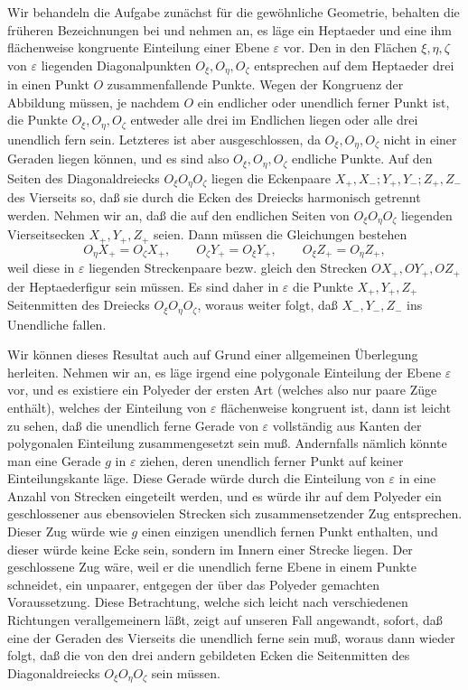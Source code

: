 \documentclass[11pt,a4paper]{article}
\begin{document}
Wir behandeln die Aufgabe zun\"achst f\"ur die gew\"ohnliche Geometrie, behalten die fr\"uheren Bezeichnungen bei und nehmen an, es l\"age ein Heptaeder und eine ihm fl\"achenweise kongruente Einteilung einer Ebene $\varepsilon$ vor. Den in den Fl\"achen $\xi,\eta,\zeta$ von $\varepsilon$ liegenden Diagonalpunkten $O_\xi,O_\eta,O_\zeta$ entsprechen auf dem Heptaeder drei in einen Punkt $O$ zusammenfallende Punkte. Wegen der Kongruenz der Abbildung m\"ussen, je nachdem $O$ ein endlicher oder unendlich ferner Punkt ist, die Punkte $O_\xi,O_\eta,O_\zeta$ entweder alle drei im Endlichen liegen oder alle drei unendlich fern sein. Letzteres ist aber ausgeschlossen, da $O_\xi,O_\eta,O_\zeta$ nicht in einer Geraden liegen k\"onnen, und es sind also $O_\xi,O_\eta,O_\zeta$ endliche Punkte. Auf den Seiten des Diagonaldreiecks $O_\xi O_\eta O_\zeta$ liegen die Eckenpaare $X_+,X_-;Y_+,Y_-;Z_+,Z_-$ des Vierseits so, da\ss{} sie durch die Ecken des Dreiecks harmonisch getrennt werden. Nehmen wir an, da\ss{} die auf den endlichen Seiten von $O_\xi O_\eta O_\zeta$ liegenden Vierseitsecken $X_+,Y_+,Z_+$ seien. Dann m\"ussen die Gleichungen bestehen
\[
 O_\eta X_+=O_\zeta X_+,
 \qquad O_\zeta Y_+=O_\xi Y_+,
 \qquad O_\xi Z_+=O_\eta Z_+,
\]
weil diese in $\varepsilon$ liegenden Streckenpaare bezw. gleich den Strecken $OX_+,OY_+,OZ_+$ der Heptaederfigur sein m\"ussen. Es sind daher in $\varepsilon$ die Punkte $X_+,Y_+,Z_+$ Seitenmitten des Dreiecks $O_\xi O_\eta O_\zeta$, woraus weiter folgt, da\ss{} $X_-,Y_-,Z_-$ ins Unendliche fallen.

Wir k\"onnen dieses Resultat auch auf Grund einer allgemeinen \"Uberlegung herleiten. Nehmen wir an, es l\"age irgend eine polygonale Einteilung der Ebene $\varepsilon$ vor, und es existiere ein Polyeder der ersten Art (welches also nur paare Z\"uge enth\"alt), welches der Einteilung von $\varepsilon$ fl\"achenweise kongruent ist, dann ist leicht zu sehen, da\ss{} die unendlich ferne Gerade von $\varepsilon$ vollst\"andig aus Kanten der polygonalen Einteilung zusammengesetzt sein mu\ss{}. Andernfalls n\"amlich k\"onnte man eine Gerade $g$ in $\varepsilon$ ziehen, deren unendlich ferner Punkt auf keiner Einteilungskante l\"age. Diese Gerade w\"urde durch die Einteilung von $\varepsilon$ in eine Anzahl von Strecken eingeteilt werden, und es w\"urde ihr auf dem Polyeder ein geschlossener aus ebensovielen Strecken sich zusammensetzender Zug entsprechen. Dieser Zug w\"urde wie $g$ einen einzigen unendlich fernen Punkt enthalten, und dieser w\"urde keine Ecke sein, sondern im Innern einer Strecke liegen. Der geschlossene Zug w\"are, weil er die unendlich ferne Ebene in einem Punkte schneidet, ein unpaarer, entgegen der \"uber das Polyeder gemachten Voraussetzung. Diese Betrachtung, welche sich leicht nach verschiedenen Richtungen verallgemeinern l\"a\ss{}t, zeigt auf unseren Fall angewandt, sofort, da\ss{} eine der Geraden des Vierseits die unendlich ferne sein mu\ss{}, woraus dann wieder folgt, da\ss{} die von den drei andern gebildeten Ecken die Seitenmitten des Diagonaldreiecks $O_\xi O_\eta O_\zeta$ sein m\"ussen.
\end{document}
